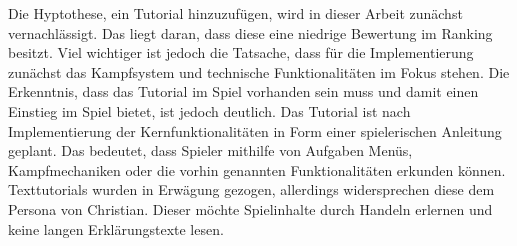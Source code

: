 Die Hyptothese, ein Tutorial hinzuzufügen, wird in dieser Arbeit zunächst vernachlässigt.
Das liegt daran, dass diese eine niedrige Bewertung im Ranking besitzt.
Viel wichtiger ist jedoch die Tatsache, dass für die Implementierung zunächst das Kampfsystem und technische Funktionalitäten im Fokus stehen.
Die Erkenntnis, dass das Tutorial im Spiel vorhanden sein muss und damit einen Einstieg im Spiel bietet, ist jedoch deutlich.
Das Tutorial ist nach Implementierung der Kernfunktionalitäten in Form einer spielerischen Anleitung geplant.
Das bedeutet, dass Spieler mithilfe von Aufgaben Menüs, Kampfmechaniken oder die vorhin genannten Funktionalitäten erkunden können.
Texttutorials wurden in Erwägung gezogen, allerdings widersprechen diese dem Persona von Christian.
Dieser möchte Spielinhalte durch Handeln erlernen und keine langen Erklärungstexte lesen.
